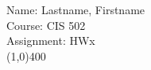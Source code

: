\documentclass[a4paper,12pt]{article}
\begin{document}
Name: Lastname, Firstname \\
Course: CIS 502 \\
Assignment: HWx \\
\line(1,0){400}
\end{document}
